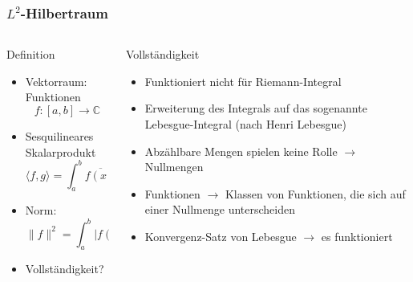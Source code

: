 %
%
%
\bgroup
\begin{frame}[t]
\setlength{\abovedisplayskip}{5pt}
\setlength{\belowdisplayskip}{5pt}
\frametitle{$L^2$-Hilbertraum}
\vspace{-20pt}
\begin{columns}[t,onlytextwidth]
\begin{column}{0.48\textwidth}
\begin{block}{Definition}
\begin{itemize}
\item
Vektorraum: Funktionen
\[
f\colon [a,b] \to \mathbb{C}
\]
\item
Sesquilineares Skalarprodukt
\[
\langle f,g\rangle
=
\int_a^b \overline{f(x)}\, g(x) \,dx
\]
\item
Norm:
\[
\|f\|^2 = \int_a^b |f(x)|^2\,dx
\]
\item Vollständigkeit?
\end{itemize}
\end{block}
\end{column}
\begin{column}{0.48\textwidth}
\begin{block}{Vollständigkeit}
\begin{itemize}
\item
Funktioniert nicht für Riemann-Integral
\item
Erweiterung des Integrals auf das sogenannte Lebesgue-Integral (nach
Henri Lebesgue)
\item
Abzählbare Mengen spielen keine Rolle $\rightarrow$ Nullmengen
\item
Funktionen $\rightarrow$ Klassen von Funktionen, die sich auf einer Nullmenge
unterscheiden
\item
Konvergenz-Satz von Lebesgue $\rightarrow$ es funktioniert
\end{itemize}
\end{block}
\end{column}
\end{columns}
\end{frame}
\egroup
